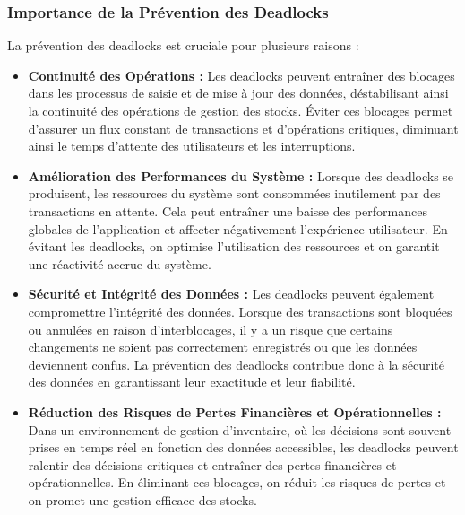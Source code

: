 \documentclass[a4paper, oneside, 12pt, final]{extreport}
\begin{document}
\subsubsection{Importance de la Prévention des Deadlocks}
La prévention des deadlocks est cruciale pour plusieurs raisons :
\begin{itemize}


\item \textbf{Continuité des Opérations :} Les deadlocks peuvent entraîner des blocages dans les processus de saisie et de mise à jour des données, déstabilisant ainsi la continuité des opérations de gestion des stocks. Éviter ces blocages permet d’assurer un flux constant de transactions et d'opérations critiques, diminuant ainsi le temps d'attente des utilisateurs et les interruptions.

\item \textbf{Amélioration des Performances du Système :} Lorsque des deadlocks se produisent, les ressources du système sont consommées inutilement par des transactions en attente. Cela peut entraîner une baisse des performances globales de l'application et affecter négativement l'expérience utilisateur. En évitant les deadlocks, on optimise l'utilisation des ressources et on garantit une réactivité accrue du système.

\item \textbf{Sécurité et Intégrité des Données :} Les deadlocks peuvent également compromettre l'intégrité des données. Lorsque des transactions sont bloquées ou annulées en raison d'interblocages, il y a un risque que certains changements ne soient pas correctement enregistrés ou que les données deviennent confus. La prévention des deadlocks contribue donc à la sécurité des données en garantissant leur exactitude et leur fiabilité.

\item \textbf{Réduction des Risques de Pertes Financières et Opérationnelles :} Dans un environnement de gestion d'inventaire, où les décisions sont souvent prises en temps réel en fonction des données accessibles, les deadlocks peuvent ralentir des décisions critiques et entraîner des pertes financières et opérationnelles. En éliminant ces blocages, on réduit les risques de pertes et on promet une gestion efficace des stocks.
\end{itemize}
\end{document}
